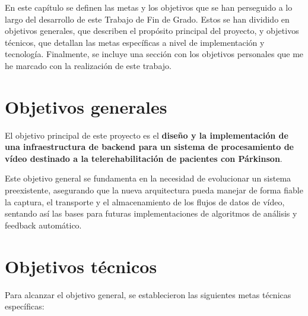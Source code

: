 
En este capítulo se definen las metas y los objetivos que se han perseguido a lo largo del desarrollo de este Trabajo de Fin de Grado. Estos se han dividido en objetivos generales, que describen el propósito principal del proyecto, y objetivos técnicos, que detallan las metas específicas a nivel de implementación y tecnología. Finalmente, se incluye una sección con los objetivos personales que me he marcado con la realización de este trabajo.

\section{Objetivos generales}

El objetivo principal de este proyecto es el \textbf{diseño y la implementación de una infraestructura de backend para un sistema de procesamiento de vídeo destinado a la telerehabilitación de pacientes con Párkinson}.

Este objetivo general se fundamenta en la necesidad de evolucionar un sistema preexistente, asegurando que la nueva arquitectura pueda manejar de forma fiable la captura, el transporte y el almacenamiento de los flujos de datos de vídeo, sentando así las bases para futuras implementaciones de algoritmos de análisis y feedback automático.

\section{Objetivos técnicos}

Para alcanzar el objetivo general, se establecieron las siguientes metas técnicas específicas:

